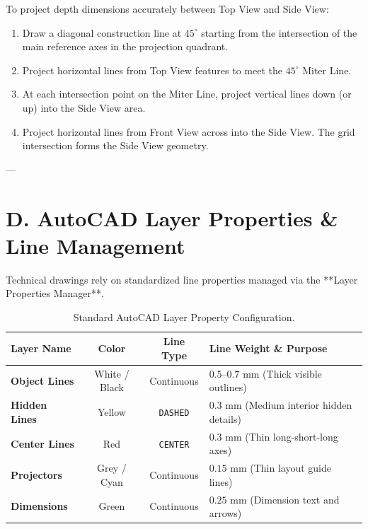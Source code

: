 \begin{keyequation}
To project depth dimensions accurately between Top View and Side View:
\begin{enumerate}
    \item Draw a diagonal construction line at $45^\circ$ starting from the intersection of the main reference axes in the projection quadrant.
    \item Project horizontal lines from Top View features to meet the $45^\circ$ Miter Line.
    \item At each intersection point on the Miter Line, project vertical lines down (or up) into the Side View area.
    \item Project horizontal lines from Front View across into the Side View. The grid intersection forms the Side View geometry.
\end{enumerate}
\end{keyequation}

---

\section{D. AutoCAD Layer Properties \& Line Management}

Technical drawings rely on standardized line properties managed via the **Layer Properties Manager**.

\begin{table}[htbp]
\centering
\small
\begin{tabularx}{\textwidth}{l c c X}
\toprule
\textbf{Layer Name} & \textbf{Color} & \textbf{Line Type} & \textbf{Line Weight \& Purpose} \\
\midrule
\textbf{Object Lines} & White / Black & Continuous & $0.5\text{--}0.7\text{ mm}$ (Thick visible outlines) \\
\textbf{Hidden Lines} & Yellow & \texttt{DASHED} & $0.3\text{ mm}$ (Medium interior hidden details) \\
\textbf{Center Lines} & Red & \texttt{CENTER} & $0.3\text{ mm}$ (Thin long-short-long axes) \\
\textbf{Projectors} & Grey / Cyan & Continuous & $0.15\text{ mm}$ (Thin layout guide lines) \\
\textbf{Dimensions} & Green & Continuous & $0.25\text{ mm}$ (Dimension text and arrows) \\
\bottomrule
\end{tabularx}
\caption{Standard AutoCAD Layer Property Configuration.}
\label{tab:autocad-layers}
\end{table}

